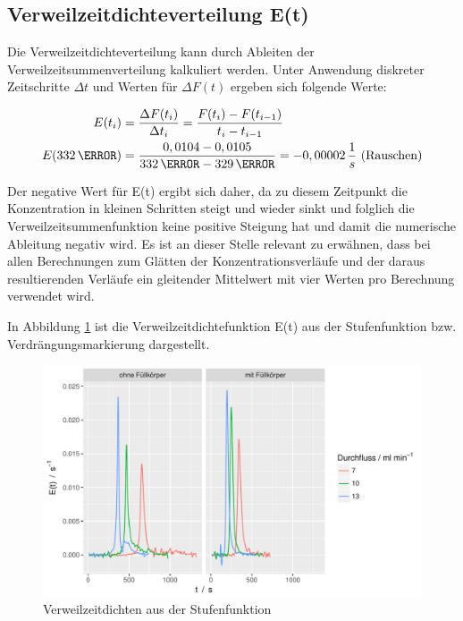\documentclass[12pt,liststotoc]{report}
\begin{document}
\subsection{Verweilzeitdichteverteilung E(t)}

Die Verweilzeitdichteverteilung kann durch Ableiten der Verweilzeitsummenverteilung kalkuliert werden. Unter Anwendung diskreter Zeitschritte $\Delta t$ und Werten für $\Delta F (t)$ ergeben sich folgende Werte:

\begin{align}
E(t_i)=&\; \frac{\Delta F(t_i)}{\Delta t_i}= \frac{F(t_{i})-F(t_{i-1})}{t_i-t_{i-1}}\\
E(332\,\s)=&\; \frac{0,0104
 - 0,0105}{332\,\s - 329\,\s} = -0,00002\,\frac{1}{s}\notag \text{ (Rauschen)}
\end{align}

Der negative Wert für E(t) ergibt sich daher, da zu diesem Zeitpunkt die Konzentration in kleinen Schritten steigt und wieder sinkt und folglich die Verweilzeitsummenfunktion keine positive Steigung hat und damit die numerische Ableitung negativ wird. Es ist an dieser Stelle relevant zu erwähnen, dass bei allen Berechnungen zum Glätten der Konzentrationsverläufe und der daraus resultierenden Verläufe ein gleitender Mittelwert mit vier Werten pro Berechnung verwendet wird.

In Abbildung \ref{dichte_step} ist die Verweilzeitdichtefunktion E(t) aus der Stufenfunktion bzw. Verdrängungsmarkierung dargestellt. 

\begin{figure}[H]
\centering
\includegraphics[width=1\textwidth]{Graphics/E_step.pdf}
\caption[Verweilzeitdichte Stufenfunktion]{Verweilzeitdichten aus der Stufenfunktion}
\label{dichte_step}
\end{figure}
\noindent
\end{document}
